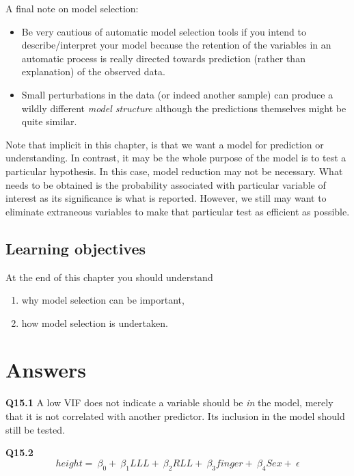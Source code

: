\documentclass[
  oneside]{krantz}
\providecommand{\tightlist}{%
  \setlength{\itemsep}{0pt}\setlength{\parskip}{0pt}}
\begin{document}
A final note on model selection:

\begin{itemize}
\tightlist
\item
  Be very cautious of automatic model selection tools if you intend to describe/interpret your model because the retention of the variables in an automatic process is really directed towards prediction (rather than explanation) of the observed data.
\item
  Small perturbations in the data (or indeed another sample) can produce a wildly different \emph{model structure} although the predictions themselves might be quite similar.
\end{itemize}

Note that implicit in this chapter, is that we want a model for prediction or understanding. In contrast, it may be the whole purpose of the model is to test a particular hypothesis. In this case, model reduction may not be necessary. What needs to be obtained is the probability associated with particular variable of interest as its significance is what is reported. However, we still may want to eliminate extraneous variables to make that particular test as efficient as possible.

\hypertarget{learning-objectives-4}{%
\subsection{Learning objectives}\label{learning-objectives-4}}

At the end of this chapter you should understand

\begin{enumerate}
\def\labelenumi{\arabic{enumi}.}
\tightlist
\item
  why model selection can be important,\\
\item
  how model selection is undertaken.
\end{enumerate}

\hypertarget{ANSmodsel}{%
\section{Answers}\label{ANSmodsel}}

\textbf{Q15.1} A low VIF does not indicate a variable should be \emph{in} the model, merely that it is not correlated with another predictor. Its inclusion in the model should still be tested.

\textbf{Q15.2} \[
height=\ {\beta{}}_0+\ {\beta{}}_1LLL+\ {\beta{}}_2RLL+\ {\beta{}}_3finger+\
{\beta{}}_4Sex+\ \epsilon{}
\]
\end{document}
